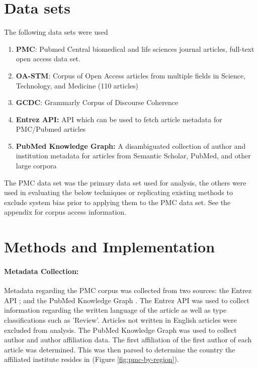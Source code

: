 \documentclass[11pt,a4paper]{article}
\begin{document}
\section{Data sets}
The following data sets were used
\begin{enumerate}
    \item \textbf{PMC}: Pubmed Central biomedical and life sciences journal articles, full-text open access data set.
    \item \textbf{OA-STM}: Corpus of Open Access articles from multiple fields in Science, Technology, and Medicine (110 articles)
    \item \textbf{GCDC}: Grammarly Corpus of Discourse Coherence
    \item \textbf{Entrez API:} API which can be used to fetch article metadata for PMC/Pubmed articles
    \item \textbf{PubMed Knowledge Graph:} A disambiguated collection of author and institution metadata for articles from Semantic Scholar, PubMed, and other large corpora
\end{enumerate}

The PMC data set was the primary data set used for analysis, the others were used in evaluating the below techniques or replicating existing methods to exclude system bias prior to applying them to the PMC data set. 
See the appendix for corpus access information.


\section{Methods and Implementation}

\paragraph{Metadata Collection:}
Metadata regarding the PMC corpus was collected from two sources: the Entrez API \cite{Sayers2010-zl}; and the PubMed Knowledge Graph \cite{Xu2020-hq}. The Entrez API was used to collect information regarding the written language of the article as well as type classifications such as 'Review'. Articles not written in English articles were excluded from analysis. The PubMed Knowledge Graph was used to collect author and author affiliation data. The first affiliation of the first author of each article was determined. This was then parsed to determine the country the affiliated institute resides in (Figure \ref{fig:pmc-by-region}).
\end{document}

